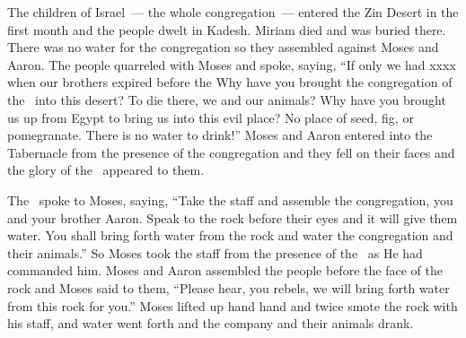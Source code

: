
\begin{inparaenum}
   The children of Israel~--- the whole congregation~--- entered the Zin Desert in the first month and the people dwelt in Kadesh. Miriam died and was buried there.%
   There was no water for the congregation so they assembled against Moses and Aaron.%
   The people quarreled with Moses and spoke, saying, ``If only we had xxxx when our brothers expired before the \lord%
   Why have you brought the congregation of the \lord\ into this desert? To die there, we and our animals?%
   Why have you brought us up from Egypt to bring us into this evil place? No place of seed, fig, or pomegranate. There is no water to drink!''%
   Moses and Aaron entered into the Tabernacle from the presence of the congregation and they fell on their faces and the glory of the \lord\ appeared to them.%
  
   The \lord\ spoke to Moses, saying,%
   ``Take the staff and assemble the congregation, you and your brother Aaron. Speak to the rock before their eyes and it will give them water. You shall bring forth water from the rock and water the congregation and their animals.''%
   So Moses took the staff from the presence of the \lord\ as He had commanded him.%
   Moses and Aaron assembled the people before the face of the rock and Moses said to them, ``Please hear, you rebels, we will bring forth water from this rock for you.''%
   Moses lifted up hand hand and twice smote the rock with his staff, and water went forth and the company and their animals drank.%
  

\end{inparaenum}
